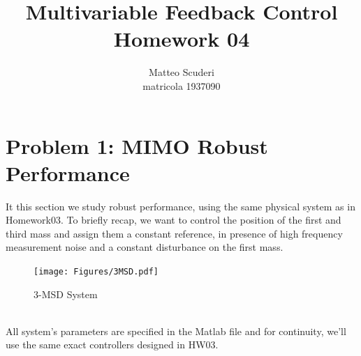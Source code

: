 \documentclass[a4paper, 12pt]{article}
\title{Multivariable Feedback Control \\ Homework 04}
\author{Matteo Scuderi\\ matricola 1937090}
\date{}
\begin{document}
\maketitle
\section{Problem 1: MIMO Robust Performance}
It this section we study robust performance, using the same physical system as in Homework03.
To briefly recap, we want to control the position of the first and third mass and assign them a constant reference, in presence of high frequency measurement noise and a constant disturbance on the first mass.
\begin{figure}[h!]
\texttt{[image: Figures/3MSD.pdf]}
    \caption*{3-MSD System}
\end{figure}\\
All system's parameters are specified in the Matlab file and for continuity, we'll use the same exact controllers designed in HW03. 
\end{document}
